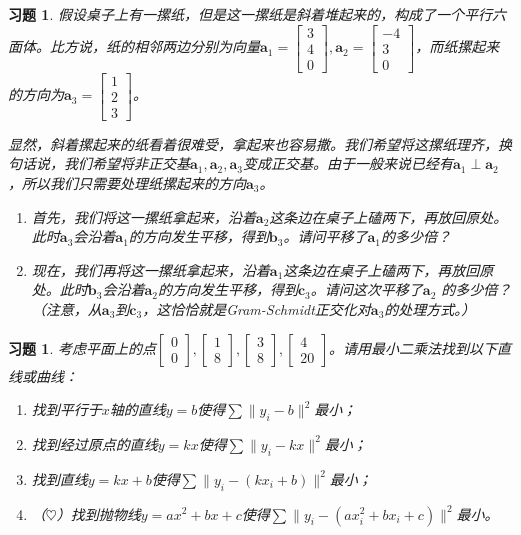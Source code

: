 \documentclass[UTF8]{ctexart}
\newtheorem{ex}[thm]{习题}
\begin{document}
\begin{ex}
假设桌子上有一摞纸，但是这一摞纸是斜着堆起来的，构成了一个平行六面体。比方说，纸的相邻两边分别为向量$\bm a_1=\begin{bmatrix}3\\4\\0\end{bmatrix},\bm a_2=\begin{bmatrix}-4\\3\\0\end{bmatrix}$，而纸摞起来的方向为$\bm a_3=\begin{bmatrix}1\\2\\3\end{bmatrix}$。

显然，斜着摞起来的纸看着很难受，拿起来也容易撒。我们希望将这摞纸理齐，换句话说，我们希望将非正交基$\bm a_1,\bm a_2,\bm a_3$变成正交基。由于一般来说已经有$\bm a_1\perp\bm a_2$，所以我们只需要处理纸摞起来的方向$\bm a_3$。
\begin{enumerate}
\item 首先，我们将这一摞纸拿起来，沿着$\bm a_2$这条边在桌子上磕两下，再放回原处。此时$\bm a_3$会沿着$\bm a_1$的方向发生平移，得到$\bm b_3$。请问平移了$\bm a_1$的多少倍？
\item 现在，我们再将这一摞纸拿起来，沿着$\bm a_1$这条边在桌子上磕两下，再放回原处。此时$\bm b_3$会沿着$\bm a_2$的方向发生平移，得到$\bm c_3$。请问这次平移了$\bm a_2$ 的多少倍？（注意，从$\bm a_3$到$\bm c_3$，这恰恰就是Gram-Schmidt正交化对$\bm a_3$的处理方式。）
\end{enumerate}
\end{ex}



\begin{ex}
考虑平面上的点$\begin{bmatrix}0\\0\end{bmatrix},\begin{bmatrix}1\\8\end{bmatrix},\begin{bmatrix}3\\8\end{bmatrix},\begin{bmatrix}4\\20\end{bmatrix}$。请用最小二乘法找到以下直线或曲线：
\begin{enumerate}
\item 找到平行于$x$轴的直线$y=b$使得$\sum\| y_i-b\|^2$最小；
\item 找到经过原点的直线$y=kx$使得$\sum\| y_i-kx\|^2$最小；
\item 找到直线$y=kx+b$使得$\sum\| y_i-(kx_i+b)\|^2$最小；
\item （$\heartsuit $）找到抛物线$y=ax^2+bx+c$使得$\sum\| y_i-(ax_i^2+bx_i+c)\|^2$最小。
\end{enumerate}
\end{ex}
\end{document}
